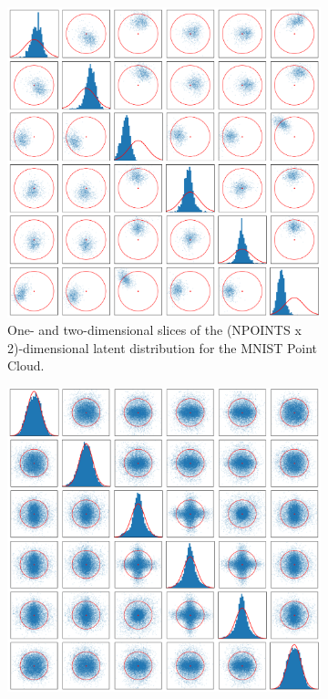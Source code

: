 \begin{figure}[p]
\centering
\begin{subfigure}[t]{.48\textwidth}
    \centering
    \includegraphics[width=\textwidth]{images/spatial_mnist/before_bij_layer_fix/calibration.png}
    \caption{One- and two-dimensional slices of the (N\textunderscore POINTS x 2)-dimensional latent distribution for the MNIST Point Cloud.}\label{fig:calibration_spatial_mnist_before}
\end{subfigure}
\hfill
\begin{subfigure}[t]{.48\textwidth}
    \centering
\includegraphics[width=\textwidth]{images/spatial_mnist/after_bij_layer_fix/code distribution.png}

\end{subfigure}
\end{figure}
